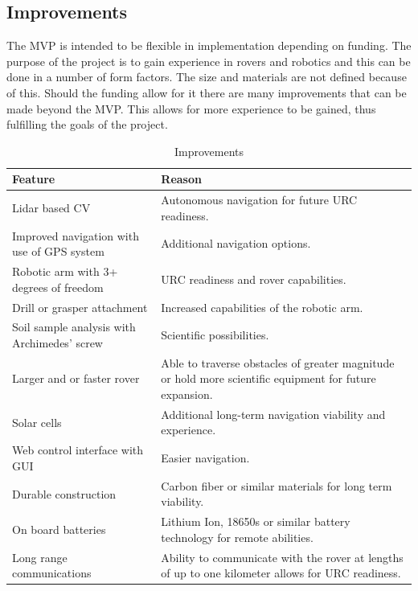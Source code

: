\documentclass[conference]{IEEEtran} %
\begin{document}
\subsection{Improvements}
\label{subsec:improvements}
The MVP is intended to be flexible in implementation depending on funding. 
The purpose of the project is to gain experience in rovers and robotics and this can be done in a number of form factors.
The size and materials are not defined because of this. 
Should the funding allow for it there are many improvements that can be made beyond the MVP. 
This allows for more experience to be gained, thus fulfilling the goals of the project.

\begin{table}[ht!]
    \caption{Improvements}
    \centering
    {\renewcommand{\arraystretch}{1.5}
    \begin{tabularx}{\linewidth}{LL}
    \hline
    \textbf{Feature} & \textbf{Reason} \\  
    \hline
    Lidar based CV & Autonomous navigation for future URC readiness. \\
    Improved navigation with use of GPS system & Additional navigation options. \\
    Robotic arm with 3+ degrees of freedom & URC readiness and rover capabilities. \\ 
    Drill or grasper attachment & Increased capabilities of the robotic arm. \\
    Soil sample analysis with Archimedes' screw & Scientific possibilities. \\
    Larger and or faster rover & Able to traverse obstacles of greater magnitude or hold more scientific equipment for future expansion. \\
    Solar cells & Additional long-term navigation viability and experience. \\
    Web control interface with GUI & Easier navigation. \\
    Durable construction & Carbon fiber or similar materials for long term viability. \\
    On board batteries & Lithium Ion, 18650s or similar battery technology for remote abilities. \\
    Long range communications & Ability to communicate with the rover at lengths of up to one kilometer allows for URC readiness. \\
    \hline
    \end{tabularx}
    }
\label{tab:mvp-two}
\end{table}
\end{document}

